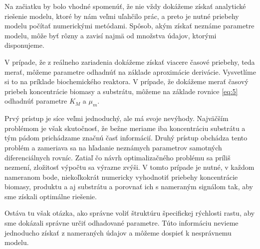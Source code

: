 Na začiatku by bolo vhodné spomenúť, že nie vždy dokážeme získať analytické riešenie modelu, ktoré by nám veľmi uľahčilo prác, a preto je nutné priebehy modelu počítať numerickými metódami. Spôsob, akým získať neznáme parametre modelu, môže byť rôzny a zavisí najmä od množstva údajov, ktorými disponujeme. 

V prípade, že z reálneho zariadenia dokážeme získať viacere časové priebehy, teda merať, môžeme parametre odhadnúť na základe aproximácie derivácie. Vysvetlíme si to na príklade biochemického reaktora. V prípade, že dokážeme merať časový priebeh koncentrácie biomasy a substrátu, môžeme na základe rovnice \ref{eq:5} odhadnúť parametre $K_{M}$ a $\mu_{m}$. 

Prvý prístup je síce veľmi jednoduchý, ale má svoje nevýhody. Najväčším problémom je však skutočnosť, že bežne meriame iba koncentráciu substrátu a tým pádom prichádzame značnú časť informácií. Druhý prístup obchádza tento problém a zameriava sa na hľadanie neznámych parametrov samotných diferenciálnych rovníc. Zatiaľ čo návrh optimalizačného problému sa príliš nezmení, zložitosť výpočtu sa výrazne zvýši. V tomto prípade je nutné, v každom nameranom bode, niekoľkokrát numericky vyhodnotiť priebehy koncentrácie biomasy, produktu a aj substrátu a porovnať ich s nameraným signálom  tak, aby sme získali optimálne riešenie.

Ostáva tu však otázka, ako správne voliť štruktúru špecifickej rýchlosti rastu, aby sme dokázali správne určiť odhadované parametre. Túto informáciu nevieme jednoducho získať z nameraných údajov a môžeme dospieť k nesprávnemu modelu.
